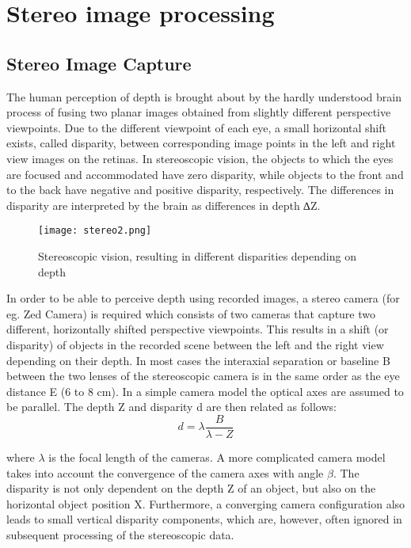 	\section{Stereo image processing}
	\label{sec:Stereo image processing}
	
	\subsection{Stereo Image Capture}
		The  human  perception  of  depth  is  brought  about  by  the  hardly  understood  brain  process  of fusing  two  planar  images  obtained  from  slightly  different  perspective  viewpoints.  Due  to  the	different  viewpoint  of  each  eye,  a  small  horizontal  shift  exists,  called disparity,  between corresponding  image  points  in  the  left  and  right  view  images  on  the  retinas.  In  stereoscopic 
		vision, the objects to which the eyes are focused and accommodated have zero disparity, while objects  to  the  front  and  to  the  back  have  negative  and  positive  disparity,  respectively. The differences in disparity are interpreted by the brain as differences in depth ∆Z. 
		~\cite{lagendijk2002stereoscopic}
		\begin{figure}[htbp]
			\centering
			\texttt{[image: stereo2.png]}
			\caption{Stereoscopic vision, resulting in different disparities depending on depth\label{Stereoscopic vision, resulting in different disparities depending on depth}}
		\end{figure}
		
		In order to be able to perceive depth using recorded images, a stereo camera (for eg. Zed Camera) is required which  consists  of  two  cameras  that  capture  two  different,  horizontally  shifted  perspective viewpoints.  This  results  in  a  shift  (or disparity)  of  objects  in  the  recorded  scene  between  the left  and  the  right  view  depending  on  their  depth.  In  most  cases  the  interaxial separation or baseline B between  the  two  lenses  of  the  stereoscopic  camera  is  in  the  same  order  as  the  eye distance E (6  to  8  cm).  In  a  simple  camera  model  the  optical  axes  are  assumed  to  be  parallel. The depth Z and disparity d are then related as follows:
		\begin{equation}
		d = \lambda \frac{B}{\lambda - Z}
		\end{equation}
		
		where $\lambda$ is the focal length of the cameras. A  more  complicated  camera  model  takes  into  account  the convergence  of  the  camera  axes  with  angle $\beta$. The  disparity  is  not  only dependent  on  the  depth Z of  an  object,  but  also  on  the  horizontal  object  position X. Furthermore,   a   converging   camera configuration   also   leads   to   small   vertical   disparity components,  which  are,  however,  often  ignored  in  subsequent  processing  of  the  stereoscopic data.
		
